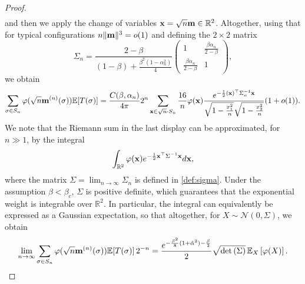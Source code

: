 \documentclass[11pt,oneside]{amsart}
\numberwithin{equation}{section}  %
\theoremstyle{plain}
\theoremstyle{remark}
\def \R {{\mathbb R}}
\def \E {{\mathbb E}}
\def \bm {{\bf m}}
\begin{document}
\begin{proof}
\begin{align}
\end{align}
and then we apply the change of variables ${\bf x}= \sqrt{n} \bm \in \R^2$. Altogether, using that for typical configurations $n\|\bm\|^3=o(1)$ and defining the $2\times2$ matrix 
\begin{equation}
\label{def:sigma_n}
\Sigma_n = \frac{2-\beta}{(1-\beta) + \frac{\beta^2(1-\alpha_n^2)}{4}} 
\begin{pmatrix} 
1 & \frac{\beta\alpha_n}{2-\beta} \\
\frac{\beta\alpha_n}{2-\beta} & 1
\end{pmatrix},
\end{equation}
we obtain 
$$
\sum_{\sigma \in S_n} \varphi(\sqrt{n} \bm^{(n)}(\sigma)) \E[T(\sigma)] =\frac{C(\beta,\alpha_n)}{4\pi} 2^n\sum_{ {\bf x} \in \sqrt{n}\cdot S_n}
\frac{16}{n}\varphi({\bf x})
\frac{ e^{-\frac{1}{2} ({\bf x})^\top \Sigma_n^{-1} {\bf x}}}{\sqrt{1-\frac{x_1^2}{n}}\sqrt{1- \frac{x_2^2}{n}}} (1+o(1)).
$$
We note that the Riemann sum in the last display can be approximated, for $n\gg 1$, by the integral
\begin{equation*}
\int_{\R^2} \varphi({\bf x})e^{ -\frac{1}{2} {\bf x}^\top \Sigma^{-1} {\bf x}} d{\bf x},
\end{equation*}
where the matrix $\Sigma = \lim_{n\to \infty} \Sigma_n$ is defined in \eqref{def:sigma}. Under the assumption $\beta<\beta_c$, $\Sigma$ is positive definite, 
which guarantees that the exponential weight is integrable over $\R^2$.
In particular, the integral can equivalently be expressed as a Gaussian expectation,
so that  altogether, for $X \sim \mathcal{N}(0, \Sigma)$, we obtain
\begin{equation}\label{eq:buca-finale}
\lim_{n \to \infty} \sum_{\sigma \in S_n} \varphi(\sqrt{n} \bm^{(n)}(\sigma)) \E[T(\sigma)] \, 2^{-n}
=
\frac{e^{- \frac{\beta^2}{8} (1+\hat\alpha^2) -\frac{\beta}{2}}}{2}  \sqrt{\det{(\Sigma)}} \, \E_X\left[ \varphi(X)\right].
\end{equation}
 

\end{proof}
\end{document}
